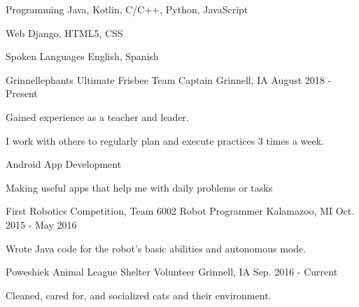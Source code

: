 \documentclass[12pt, a4paper]{awesome-cv}
\begin{document}
\begin{cvskills}
  \cvskill
    {Programming} 
    {Java, Kotlin, C/C++, Python, JavaScript} 

  \cvskill
    {Web} 
    {Django, HTML5, CSS} 


  \cvskill
    {Spoken Languages} 
    {English, Spanish} 

\end{cvskills}


\begin{cventries}
  \cventry
    {Grinnellephants Ultimate Frisbee}
    {Team Captain}
    {Grinnell, IA}
    {August 2018 - Present}
    {
      \begin{cvitems}
        \item {Gained experience as a teacher and leader.}
        \item {I work with others to regularly plan and execute practices 3 times a week.}
      \end{cvitems}
    }

    \cventry
      {}
      {Android App Development}
      {}
      {}
      {
        \begin{cvitems}
          \item {Making useful apps that help me with daily problems or tasks}
        \end{cvitems}
      }

  \cventry
    {First Robotics Competition, Team 6002}
    {Robot Programmer}
    {Kalamazoo, MI}
    {Oct. 2015 - May 2016}
    {
      \begin{cvitems}
        \item {Wrote Java code for the robot’s basic abilities and autonomous mode.}
      \end{cvitems}
    }

  \cventry
    {Poweshiek Animal League Shelter}
    {Volunteer}
    {Grinnell, IA}
    {Sep. 2016 - Current}
    {
      \begin{cvitems}
        \item {Cleaned, cared for, and socialized cats and their environment.}
      \end{cvitems}
    }

\end{cventries}
\end{document}
